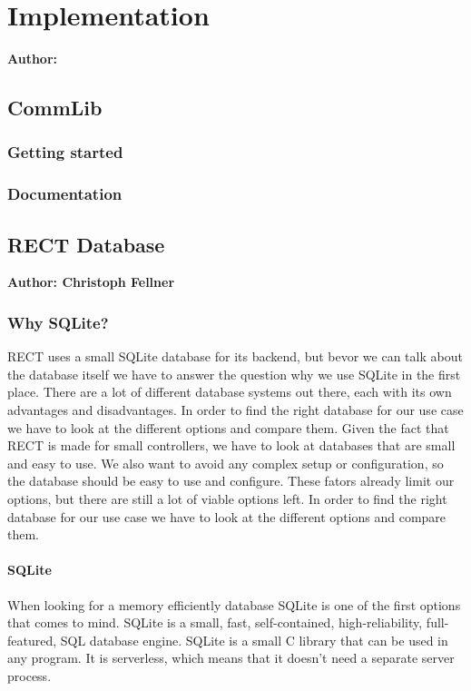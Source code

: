 \chapter{Implementation}

\textbf{Author: } 

\section{CommLib}
\subsection{Getting started}



\subsection{Documentation}

\section{RECT Database}
\textbf{Author: Christoph Fellner}

\subsection{Why SQLite?}
RECT uses a small SQLite database for its backend, but bevor we can talk about the database itself we have to answer the question why we use SQLite in the first place. There are a lot of different database systems out there, each with its own advantages and disadvantages. 
In order to find the right database for our use case we have to look at the different options and compare them. Given the fact that RECT is made for small controllers, we have to look at databases that are small and easy to use. We also want to avoid any complex setup or configuration, so the database should be easy to use and configure. 
These fators already limit our options, but there are still a lot of viable options left. In order to find the right database for our use case we have to look at the different options and compare them. 

\subsubsection{SQLite}
When looking for a memory efficiently database SQLite is one of the first options that comes to mind. SQLite is a small, fast, self-contained, high-reliability, full-featured, SQL database engine.
SQLite is a small C library that can be used in any program. It is serverless, which means that it doesn't need a separate server process. 

